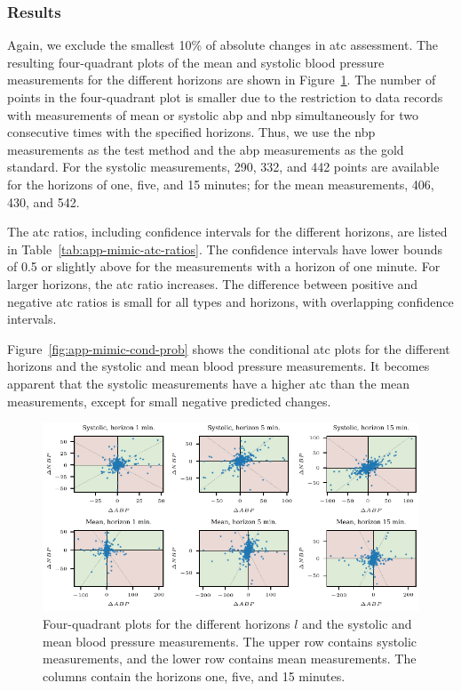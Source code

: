 \documentclass[pdflatex]{sn-jnl}
\theoremstyle{plain}%
\theoremstyle{definition}
\begin{document}
\subsubsection*{Results}

Again, we exclude the smallest 10\% of absolute changes in \ac{atc} assessment.
The resulting four-quadrant plots of the mean and systolic blood pressure measurements for the different horizons are shown in Figure~\ref{fig:app-mimic-4q}.
The number of points in the four-quadrant plot is smaller due to the restriction to data records with measurements of mean or systolic \ac{abp} and \ac{nbp} simultaneously for two consecutive times with the specified horizons.
Thus, we use the \ac{nbp} measurements as the test method and the \ac{abp} measurements as the gold standard.
For the systolic measurements, 290, 332, and 442 points are available for the horizons of one, five, and 15 minutes; for the mean measurements, 406, 430, and 542.

The \ac{atc} ratios, including confidence intervals for the different horizons, are listed in Table~\ref{tab:app-mimic-atc-ratios}.
The confidence intervals have lower bounds of 0.5 or slightly above for the measurements with a horizon of one minute.
For larger horizons, the \ac{atc} ratio increases.
The difference between positive and negative \ac{atc} ratios is small for all types and horizons, with overlapping confidence intervals.

Figure~\ref{fig:app-mimic-cond-prob} shows the conditional \ac{atc} plots for the different horizons and the systolic and mean blood pressure measurements.
It becomes apparent that the systolic measurements have a higher \ac{atc} than the mean measurements, except for small negative predicted changes.

\begin{figure}
    \centering
    \includegraphics{plots/mimic/plot_4q}
    \caption[Four-quadrant plots for the different horizons and the systolic and mean blood pressure measurements. ]{Four-quadrant plots for the different horizons $l$ and the systolic and mean blood pressure measurements. The upper row contains systolic measurements, and the lower row contains mean measurements. The columns contain the horizons one, five, and 15 minutes.}
    \label{fig:app-mimic-4q}
\end{figure}
\end{document}
